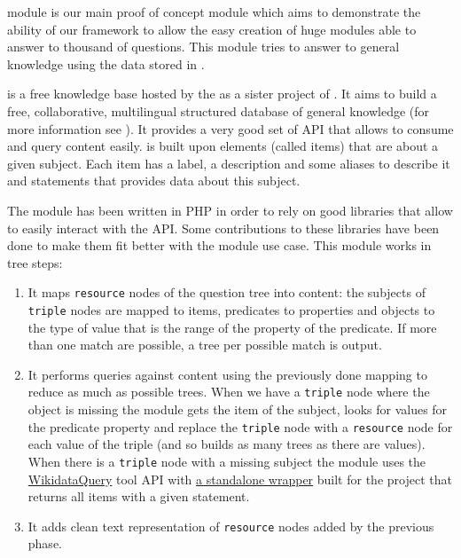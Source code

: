 \Wikidata module is our main proof of concept module which aims to demonstrate the ability of our framework to allow the easy creation of huge modules able to answer to thousand of questions. This module tries to answer to general knowledge using the data stored in \href{http://www.wikidata.org}{\Wikidata}.

\Wikidata is a free knowledge base hosted by the \Wikimedia as a sister project of \Wikipedia. It aims to build a free, collaborative, multilingual structured database of general knowledge (for more information see \cite{42240}). It provides a very good set of API that allows to consume and query \Wikidata content easily. \Wikidata is built upon elements (called items) that are about a given subject. Each item has a label, a description and some aliases to describe it and statements that provides data about this subject.

The \Wikidata module has been written in PHP in order to rely on good libraries that allow to easily interact with the \Wikidata API. Some contributions to these libraries have been done to make them fit better with the module use case. This module works in tree steps:
\begin{enumerate}
    \item It maps \texttt{resource} nodes of the question tree into \Wikidata content: the subjects of \texttt{triple} nodes are mapped to \Wikidata items, predicates to \Wikidata properties and objects to the type of value that is the range of the \Wikidata property of the predicate. If more than one match are possible, a tree per possible match is output.
    \item It performs queries against \Wikidata content using the previously done mapping to reduce as much as possible trees. When we have a \texttt{triple} node where the object is missing the module gets the \Wikidata item of the subject, looks for values for the predicate property and replace the \texttt{triple} node with a \texttt{resource} node for each value of the triple (and so builds as many trees as there are values). When there is a \texttt{triple} node with a missing subject the module uses the \href{http://wdq.wmflabs.org}{WikidataQuery} tool API with \href{https://github.com/ProjetPP/WikidataQueryApi}{a standalone wrapper} built for the project that returns all items with a given statement.
    \item It adds clean text representation of \texttt{resource} nodes added by the previous phase.
\end{enumerate}

